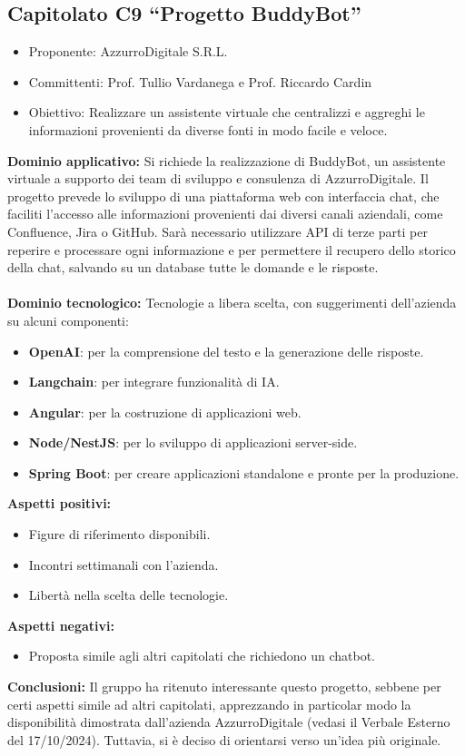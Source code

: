\documentclass[10pt]{article}
\begin{document}
\subsection{Capitolato C9 “Progetto BuddyBot”}
\begin{itemize}
    \item Proponente: AzzurroDigitale S.R.L.
    \item Committenti: Prof. Tullio Vardanega e Prof. Riccardo Cardin
    \item Obiettivo: Realizzare un assistente virtuale che centralizzi e aggreghi le informazioni provenienti da diverse fonti in modo facile e veloce.
\end{itemize}
\textbf{Dominio applicativo:}  
Si richiede la realizzazione di BuddyBot, un assistente virtuale a supporto dei team di sviluppo e consulenza di AzzurroDigitale. Il progetto prevede lo sviluppo di una piattaforma web con interfaccia chat, che faciliti l’accesso alle informazioni provenienti dai diversi canali aziendali, come Confluence, Jira o GitHub. Sarà necessario utilizzare API di terze parti per reperire e processare ogni informazione e per permettere il recupero dello storico della chat, salvando su un database tutte le domande e le risposte.\\
\\
\textbf{Dominio tecnologico:}  
Tecnologie a libera scelta, con suggerimenti dell’azienda su alcuni componenti:
\begin{itemize}
    \item \textbf{OpenAI}: per la comprensione del testo e la generazione delle risposte.
    \item \textbf{Langchain}: per integrare funzionalità di IA.
    \item \textbf{Angular}: per la costruzione di applicazioni web.
    \item \textbf{Node/NestJS}: per lo sviluppo di applicazioni server-side.
    \item \textbf{Spring Boot}: per creare applicazioni standalone e pronte per la produzione.
\end{itemize}
\textbf{Aspetti positivi:}
\begin{itemize}
    \item Figure di riferimento disponibili.
    \item Incontri settimanali con l’azienda.
    \item Libertà nella scelta delle tecnologie.
\end{itemize}
\textbf{Aspetti negativi:}
\begin{itemize}
    \item Proposta simile agli altri capitolati che richiedono un chatbot.
\end{itemize}
\textbf{Conclusioni:}  
Il gruppo ha ritenuto interessante questo progetto, sebbene per certi aspetti simile ad altri capitolati, apprezzando in particolar modo la disponibilità dimostrata dall’azienda AzzurroDigitale (vedasi il Verbale Esterno del 17/10/2024). Tuttavia, si è deciso di orientarsi verso un’idea più originale.
\end{document}
